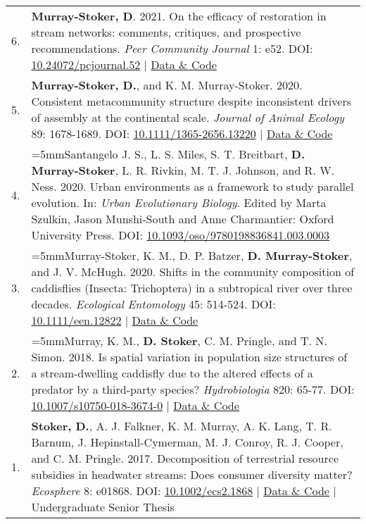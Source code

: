 \documentclass[letterpaper,11pt,oneside]{article}
\begin{document}
\begin{longtable}{@{} p{0.5cm} >{\raggedright\arraybackslash}p{16.7cm}}
6. & \hangindent=5mm\textbf{Murray-Stoker, D}. 2021. On the efficacy of restoration in stream networks: comments, critiques, and prospective recommendations. \textit{Peer Community Journal} 1: e52. DOI: {\href{https://peercommunityjournal.org/articles/10.24072/pcjournal.52/}{10.24072/pcjournal.52}} | {\href{https://doi.org/10.6084/m9.figshare.6448010.v7}{Data \& Code}} \\
5. & \hangindent=5mm\textbf{Murray-Stoker, D.}, and K. M. Murray-Stoker. 2020. Consistent metacommunity structure despite inconsistent drivers of assembly at the continental scale. \textit{Journal of Animal Ecology} 89: 1678-1689. DOI: {\href{http://besjournals.onlinelibrary.wiley.com/doi/abs/10.1111/1365-2656.13220}{10.1111/1365-2656.13220}} | {\href{https://osf.io/62je8/}{Data \& Code}} \\
4. & \hangindent=5mmSantangelo J. S., L. S. Miles, S. T. Breitbart, \textbf{D. Murray-Stoker}, L. R. Rivkin, M. T. J. Johnson, and R. W. Ness. 2020. Urban environments as a framework to study parallel evolution. In: \textit{Urban Evolutionary Biology}. Edited by Marta Szulkin, Jason Munshi-South and Anne Charmantier: Oxford University Press. DOI: {\href{https://oxford.universitypressscholarship.com/view/10.1093/oso/9780198836841.001.0001/oso-9780198836841-chapter-3}{10.1093/oso/9780198836841.003.0003}} \\
3. & \hangindent=5mmMurray-Stoker, K. M., D. P. Batzer, \textbf{D. Murray-Stoker}, and J. V. McHugh. 2020. Shifts in the community composition of caddisflies (Insecta: Trichoptera) in a subtropical river over three decades. \textit{Ecological Entomology} 45: 514-524. DOI: {\href{https://resjournals.onlinelibrary.wiley.com/doi/full/10.1111/een.12822}{10.1111/een.12822}} | {\href{https://doi.org/10.6084/m9.figshare.14237687.v1}{Data \& Code}} \\
2. & \hangindent=5mmMurray, K. M., \textbf{D. Stoker}, C. M. Pringle, and T. N. Simon. 2018. Is spatial variation in population size structures of a stream-dwelling caddisfly due to the altered effects of a predator by a third-party species? \textit{Hydrobiologia} 820: 65-77. DOI: {\href{https://link.springer.com/article/10.1007/s10750-018-3674-0}{10.1007/s10750-018-3674-0}} | {\href{https://doi.org/10.6084/m9.figshare.5856651.v1}{Data \& Code}} \\
1. & \hangindent=5mm\textbf{Stoker, D.}, A. J. Falkner, K. M. Murray, A. K. Lang, T. R. Barnum, J. Hepinstall-Cymerman, M. J. Conroy, R. J. Cooper, and C. M. Pringle. 2017. Decomposition of terrestrial resource subsidies in headwater streams: Does consumer diversity matter? \textit{Ecosphere} 8: e01868. DOI: {\href{https://esajournals.onlinelibrary.wiley.com/doi/full/10.1002/ecs2.1868}{10.1002/ecs2.1868}} | {\href{https://doi.org/10.6084/m9.figshare.6025811.v1}{Data \& Code}} | Undergraduate Senior Thesis \\
\end{longtable}
\end{document}

